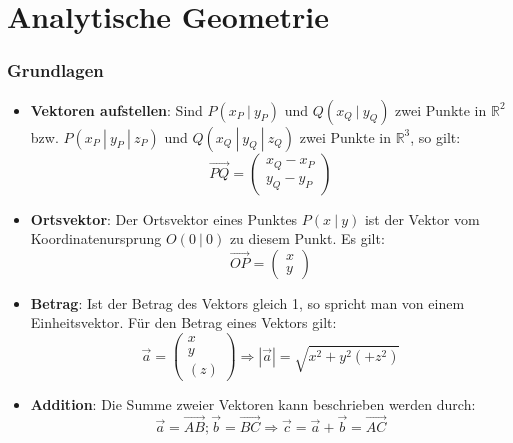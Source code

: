 \newpage
\part{Analytische Geometrie}

\section{Grundlagen}
\begin{itemize}

  \item \textbf{Vektoren aufstellen}: Sind $P(x_P~|~y_P)$ und $Q(x_Q~|~y_Q)$ zwei Punkte in $\mathbb{R}^2$ bzw. $P(x_P~|~y_P~|~z_P)$ und $Q(x_Q~|~y_Q~|~z_Q)$ zwei Punkte in $\mathbb{R}^3$, so gilt:
  \begin{equation}
    \overrightarrow{PQ}=\left(\begin{array}{c}x_Q-x_P \\ y_Q-y_P \end{array}\right)
  \end{equation}

  \item \textbf{Ortsvektor}:
  Der Ortsvektor eines Punktes $P(x~|~y)$ ist der Vektor vom Koordinatenursprung $O(0~|~0)$ zu diesem Punkt. Es gilt:
  \begin{equation}
    \overrightarrow{OP}=\left(\begin{array}{c}x \\ y \end{array}  \right)
  \end{equation}

  \item \textbf{Betrag}: Ist der Betrag des Vektors gleich 1, so spricht man von einem Einheitsvektor. Für den Betrag eines Vektors gilt:
  \begin{equation}
  \overrightarrow{a}=\left(\begin{array}{c}x\\y\\(z)\end{array}\right) \Rightarrow \left|\overrightarrow{a}\right| = \sqrt{x^2+y^2(+z^2)}
  \end{equation}

  \item \textbf{Addition}: Die Summe zweier Vektoren kann beschrieben werden durch:
  \begin{equation}
    \overrightarrow{a}=\overrightarrow{AB}; \overrightarrow{b}=\overrightarrow{BC} \Rightarrow \overrightarrow{c} = \overrightarrow{a} + \overrightarrow{b} = \overrightarrow{AC}
  \end{equation}

\end{itemize}

